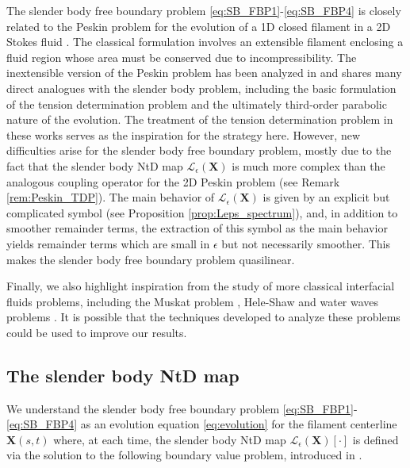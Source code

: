 \documentclass[11pt,reqno]{amsart}
\newcommand{\X}{\bm{X}}
\newcommand{\mc}[1]{\mathcal{#1}}
\theoremstyle{definition}
\begin{document}
The slender body free boundary problem \eqref{eq:SB_FBP1}-\eqref{eq:SB_FBP4} is closely related to the Peskin problem for the evolution of a 1D closed filament in a 2D Stokes fluid 
\cite{cameron2024critical, chen2023peskin, gancedo2020global, garcia2023critical, garcia2023peskin, lin2019solvability, mori2019well, tong2021regularized, tong2023geometric}. The classical formulation involves an extensible filament enclosing a fluid region whose area must be conserved due to incompressibility. The inextensible version of the Peskin problem has been analyzed in \cite{kuo2023tension,garcia2025immersed} and shares many direct analogues with the slender body problem, including the basic formulation of the tension determination problem and the ultimately third-order parabolic nature of the evolution. The treatment of the tension determination problem in these works serves as the inspiration for the strategy here. 
However, new difficulties arise for the slender body free boundary problem, mostly due to the fact that the slender body NtD map $\mc{L}_\epsilon(\X)$ is much more complex than the analogous coupling operator for the 2D Peskin problem (see Remark \ref{rem:Peskin_TDP}). The main behavior of $\mc{L}_\epsilon(\X)$ is given by an explicit but complicated symbol (see Proposition \ref{prop:Leps_spectrum}), and, in addition to smoother remainder terms, the extraction of this symbol as the main behavior yields remainder terms which are small in $\epsilon$ but not necessarily smoother. This makes the slender body free boundary problem quasilinear.


Finally, we also highlight inspiration from the study of more classical interfacial fluids problems, including the Muskat problem \cite{alazard2020paralinearization, flynn2021vanishing, nguyen2020paradifferential}, Hele-Shaw and water waves problems \cite{alazard2014cauchy, alazard2009paralinearization, beale1993growth,hou1994removing,lannes2005well}. It is possible that the techniques developed to analyze these problems could be used to improve our results.  



\subsection{The slender body NtD map}\label{subsec:SB_NTD}
We understand the slender body free boundary problem \eqref{eq:SB_FBP1}-\eqref{eq:SB_FBP4} as an evolution equation \eqref{eq:evolution} for the filament centerline $\X(s,t)$ where, at each time, the slender body NtD map $\mc{L}_\epsilon(\X)[\cdot]$ is defined via the solution to the following boundary value problem, introduced in \cite{closed_loop,free_ends}. 
\end{document}
